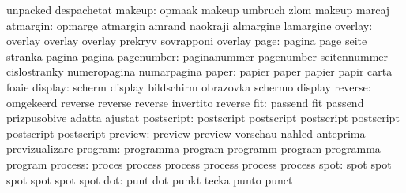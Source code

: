                            unpacked                  despachetat
                   makeup: opmaak                    makeup
                           umbruch                   zlom
                           makeup                    marcaj
                 atmargin: opmarge                   atmargin
                           amrand                    naokraji
                           almargine                 lamargine
                  overlay: overlay                   overlay
                           overlay                   prekryv
                           sovrapponi                overlay
                     page: pagina                    page
                           seite                     stranka
                           pagina                    pagina
               pagenumber: paginanummer              pagenumber
                           seitennummer              cislostranky
                           numeropagina              numarpagina
                    paper: papier                    paper
                           papier                    papir
                           carta                     foaie
                  display: scherm                    display
                           bildschirm                obrazovka
                           schermo                   display %
                  reverse: omgekeerd                 reverse
                           reverse                   reverse
                           invertito                 reverse %
                      fit: passend                   fit
                           passend                   prizpusobive
                           adatta                    ajustat
               postscript: postscript                postscript
                           postscript                postscript
                           postscript                postscript
                  preview: preview                   preview
                           vorschau                  nahled
                           anteprima                 previzualizare
                  program: programma                 program
                           programm                  program
                           programma                 program
process: proces   process
         process  process
         process  process
   spot: spot spot
         spot spot
         spot spot
                      dot: punt                      dot
                           punkt                     tecka
                           punto                     punct
